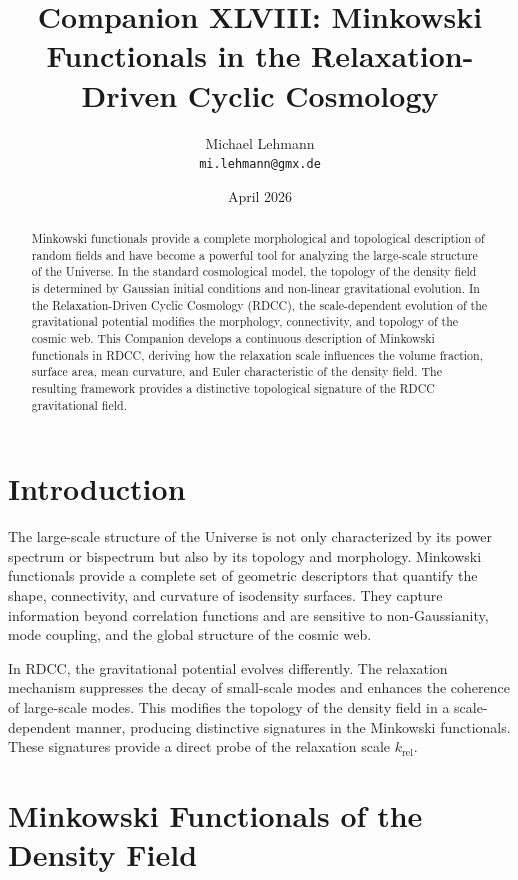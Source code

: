 \documentclass[11pt,a4paper]{article}
\title{\textbf{Companion XLVIII: Minkowski Functionals in the Relaxation-Driven Cyclic Cosmology}}
\author{Michael Lehmann \\ \texttt{mi.lehmann@gmx.de}}
\date{April 2026}
\begin{document}
\maketitle

\begin{abstract}
Minkowski functionals provide a complete morphological and topological description 
of random fields and have become a powerful tool for analyzing the large-scale 
structure of the Universe. In the standard cosmological model, the topology of the 
density field is determined by Gaussian initial conditions and non-linear 
gravitational evolution. In the Relaxation-Driven Cyclic Cosmology (RDCC), the 
scale-dependent evolution of the gravitational potential modifies the morphology, 
connectivity, and topology of the cosmic web. This Companion develops a continuous 
description of Minkowski functionals in RDCC, deriving how the relaxation scale 
influences the volume fraction, surface area, mean curvature, and Euler 
characteristic of the density field. The resulting framework provides a 
distinctive topological signature of the RDCC gravitational field.
\end{abstract}
\section{Introduction}

The large-scale structure of the Universe is not only characterized by its power 
spectrum or bispectrum but also by its topology and morphology. Minkowski 
functionals provide a complete set of geometric descriptors that quantify the 
shape, connectivity, and curvature of isodensity surfaces. They capture 
information beyond correlation functions and are sensitive to non-Gaussianity, 
mode coupling, and the global structure of the cosmic web.

In RDCC, the gravitational potential evolves differently. The relaxation mechanism 
suppresses the decay of small-scale modes and enhances the coherence of large-scale 
modes. This modifies the topology of the density field in a scale-dependent manner, 
producing distinctive signatures in the Minkowski functionals. These signatures 
provide a direct probe of the relaxation scale $k_{\mathrm{rel}}$.
\section{Minkowski Functionals of the Density Field}
\end{document}

